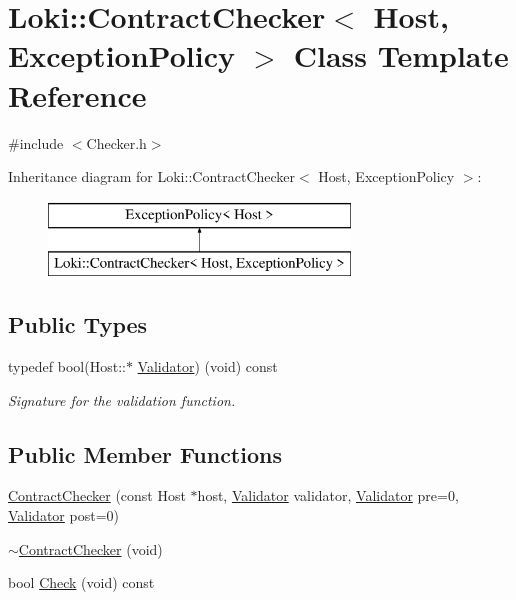 \hypertarget{classLoki_1_1ContractChecker}{}\section{Loki\+:\+:Contract\+Checker$<$ Host, Exception\+Policy $>$ Class Template Reference}
\label{classLoki_1_1ContractChecker}


{\ttfamily \#include $<$Checker.\+h$>$}

Inheritance diagram for Loki\+:\+:Contract\+Checker$<$ Host, Exception\+Policy $>$\+:\begin{figure}[H]
\begin{center}
\leavevmode
\includegraphics[height=2.000000cm]{classLoki_1_1ContractChecker}
\end{center}
\end{figure}
\subsection*{Public Types}
\begin{DoxyCompactItemize}
\item 
\hypertarget{classLoki_1_1ContractChecker_a3c78d586bc864909a56ad83c477ccf6b}{}typedef bool(Host\+::$\ast$ \hyperlink{classLoki_1_1ContractChecker_a3c78d586bc864909a56ad83c477ccf6b}{Validator}) (void) const \label{classLoki_1_1ContractChecker_a3c78d586bc864909a56ad83c477ccf6b}

\begin{DoxyCompactList}\small\item\em Signature for the validation function. \end{DoxyCompactList}\end{DoxyCompactItemize}
\subsection*{Public Member Functions}
\begin{DoxyCompactItemize}
\item 
\hyperlink{classLoki_1_1ContractChecker_a47a88a788d4099204e3a49593e4ff2a2}{Contract\+Checker} (const Host $\ast$host, \hyperlink{structValidator}{Validator} validator, \hyperlink{structValidator}{Validator} pre=0, \hyperlink{structValidator}{Validator} post=0)
\item 
\hyperlink{classLoki_1_1ContractChecker_aac668398deabba5291b9025b4ac4eafd}{$\sim$\+Contract\+Checker} (void)
\item 
bool \hyperlink{classLoki_1_1ContractChecker_a812565f4dccc8d50be8f7b9c91841a51}{Check} (void) const 
\end{DoxyCompactItemize}


